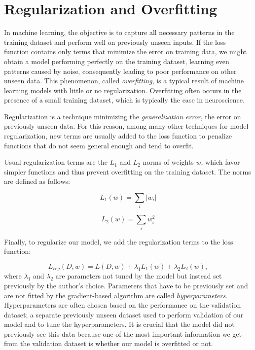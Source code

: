 \section{Regularization and Overfitting}

In machine learning, the objective is to capture all necessary patterns in the training dataset and perform well on previously unseen inputs. If the loss function contains only terms that minimize the error on training data, we might obtain a model performing perfectly on the training dataset, learning even patterns caused by noise, consequently leading to poor performance on other unseen data. This phenomenon, called \emph{overfitting}, is a typical result of machine learning models with little or no regularization. Overfitting often occurs in the presence of a small training dataset, which is typically the case in neuroscience.


Regularization is a technique minimizing the \emph{generalization error}, the error on previously unseen data. For this reason, among many other techniques for model regularization, new terms are usually added to the loss function to penalize functions that do not seem general enough and tend to overfit.

Usual regularization terms are the $L_1$ and $L_2$ norms of weights $w$, which favor simpler functions and thus prevent overfitting on the training dataset. The norms are defined as follows:

\begin{equation}
L_1(w) = \sum_i |w_i|
\end{equation}

\begin{equation}
L_2(w) = \sum_i w_i^2
\end{equation}

Finally, to regularize our model, we add the regularization terms to the loss function:

\begin{equation}
L_{reg}(D, w) = L(D, w) + \lambda_1 L_1(w) + \lambda_2 L_2(w),
\end{equation}
where $\lambda_1$ and $\lambda_2$ are parameters not tuned by the model but instead set previously by the author’s choice. Parameters that have to be previously set and are not fitted by the gradient-based algorithm are called \emph{hyperparameters}. Hyperparameters are often chosen based on the performance on the validation dataset; a separate previously unseen dataset used to perform validation of our model and to tune the hyperparameters. It is crucial that the model did not previously see this data because one of the most important information we get from the validation dataset is whether our model is overfitted or not.


